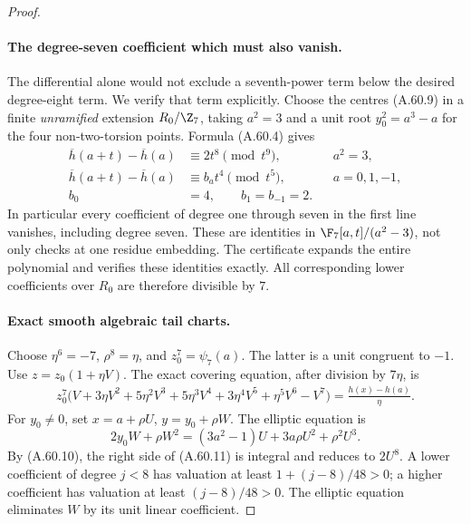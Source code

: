 \begin{proof}
\paragraph{The degree-seven coefficient which must also vanish.}
The differential alone would not exclude a seventh-power
term below the desired degree-eight term. We verify that
term explicitly. Choose the centres (A.60.9) in a finite
\emph{unramified} extension \(R_0/\Z_7\), taking
\(a^2=3\) and a unit root \(y_0^2=a^3-a\) for the
four non-two-torsion points. Formula (A.60.4) gives
\[
 \begin{aligned}
  \overline h(a+t)-\overline h(a)&\equiv2t^8\pmod {t^9},
                                      &&a^2=3,\\
  \overline h(a+t)-\overline h(a)&\equiv b_at^4\pmod {t^5},
                                      &&a=0,1,-1,\\
                         b_0&=4,\qquad b_1=b_{-1}=2.
 \end{aligned}                                          \tag{A.60.10}
\]
In particular every coefficient of degree one through
seven in the first line vanishes, including degree
seven. These are identities in
\(\F_7[a,t]/(a^2-3)\), not only checks at one residue
embedding. The certificate expands the entire
polynomial and verifies these identities exactly.
All corresponding lower coefficients over \(R_0\)
are therefore divisible by \(7\).

\paragraph{Exact smooth algebraic tail charts.}
Choose \(\eta^6=-7\), \(\rho^8=\eta\), and
\(z_0^7=\psi _7(a)\). The latter is a unit congruent
to \(-1\). Use \(z=z_0(1+\eta V)\). The exact
covering equation, after division by \(7\eta\), is
\[
 \begin{split}
 z_0^7\bigl(V+3\eta V^2+5\eta^2V^3+5\eta^3V^4
                         +3\eta^4V^5+\eta^5V^6-V^7\bigr)
              =\frac{h(x)-h(a)}{\eta}.
 \end{split}                                            \tag{A.60.11}
\]
For \(y_0\ne0\), set \(x=a+\rho U\),
\(y=y_0+\rho W\). The elliptic equation is
\[
 2y_0W+\rho W^2
              =(3a^2-1)U+3a\rho U^2+\rho^2U^3.       \tag{A.60.12}
\]
By (A.60.10), the right side of (A.60.11) is
integral and reduces to \(2U^8\). A lower coefficient
of degree \(j<8\) has valuation at least
\(1+(j-8)/48>0\); a higher coefficient has valuation
at least \((j-8)/48>0\). The elliptic equation
eliminates \(W\) by its unit linear coefficient.


\end{proof}
